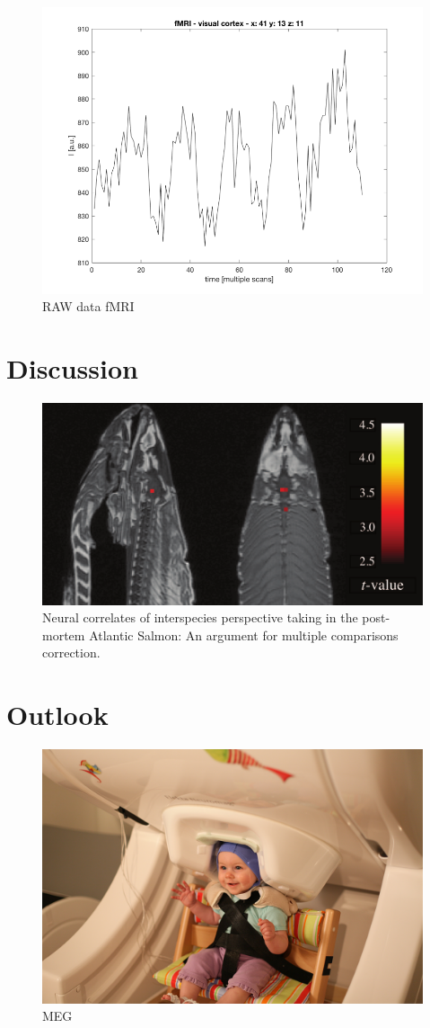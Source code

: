 \documentclass[a4paper]{scrartcl}
\begin{document}
\begin{figure}[bh]
  \centering
  \includegraphics[width = .7\textwidth]{pictures/voxelIntensity.png}
  \caption{RAW data fMRI}
  \label{fig:compTesla}
\end{figure}

\section{Discussion}
\label{sec:discussion}

\begin{figure}[bh]
  \centering
  \includegraphics[width = .7\textwidth]{pictures/deathFish.png}
  \caption{Neural correlates of interspecies perspective taking in the post-mortem Atlantic Salmon: An argument for multiple comparisons correction.\cite{fish}}
  \label{fig:compTesla}
\end{figure}



\FloatBarrier

\section{Outlook}
\label{sec:outlook}

\begin{figure}[bh]
  \centering
  \includegraphics[width = .7\textwidth]{pictures/megKiddo.png}
  \caption{MEG}
  \label{fig:compTesla}
\end{figure}

\FloatBarrier

\newpage
\printbibliography
\end{document}
